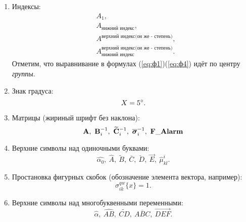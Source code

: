 \begin{enumerate}
\item Индексы:
{\zerodisplayskips
	\begin{align}
	& A_1, \label{eq:ф1}\\
	& A_{\text{нижний индекс}}, \label{eq:ф2}\\
	& A^{\text{верхний индекс(он же - степень)}}, \label{eq:ф3}\\
	& A_{\text{нижний индекс}}^{\text{верхний индекс(он же - степень)}}. \label{eq:ф4}
	\end{align}	
}%
Отметим, что выравнивание в формулах (\ref{eq:ф1})\ndash (\ref{eq:ф4}) идёт по центру \textit{группы}.
\item Знак градуса:
{\zerodisplayskips
\begin{equation}
X=5\degree.
\end{equation}	
}%
\item Матрицы (жириный шрифт без наклона):
{\zerodisplayskips
\begin{equation}
	\mathbf{A},~\mathbf{B}_i^{-1},~\widetilde{\mathbf{C}}_i^{-1},~\overline{\boldsymbol{\sigma}}_i^{-1},~\mathbf{F\_Alarm}
\end{equation}	
}%
\item Верхние символы над одиночными буквами:	
{\zerodisplayskips
\begin{equation}
	\hat{\alpha_0},~\hat{A},~\tilde{B},~\bar{C},~\check{D},~\vec{E},~\hat{\mu}_{kl}^i.
\end{equation}
}%
\item Простановка фигурных скобок (обозначение элемента вектора, например):	
{\zerodisplayskips
	\begin{equation}
	\sigma_{ik}^{qw}\{ x \}=1.
	\end{equation}
}%
\item Верхние символы над многобуквенными переменными:	
{\zerodisplayskips
	\begin{equation}
	\widehat{\alpha},~\widehat{AB},~\widetilde{CD},~\overline{ABC},~\overrightarrow{DEF}.
	\end{equation}
}
\end{enumerate}
